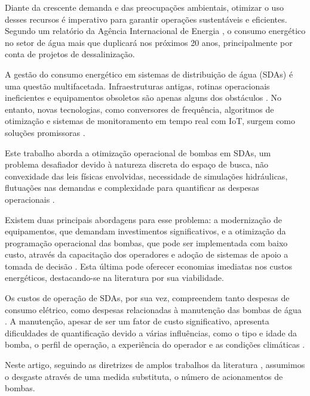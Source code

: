 \documentclass[12pt,a4paper,oneside,linenumbers=off,latinmodern=off,timesnews=off,english,spanish]{rctart-class/rctart}
\begin{document}
Diante da crescente demanda e das preocupações ambientais, otimizar o uso desses recursos é imperativo para garantir operações sustentáveis e eficientes. Segundo um relatório da Agência Internacional de Energia \cite{ieaWEO2016Special}, o consumo energético no setor de água mais que duplicará nos próximos 20 anos, principalmente por conta de projetos de dessalinização.

A gestão do consumo energético em sistemas de distribuição de água (SDAs) é uma questão multifacetada. Infraestruturas antigas, rotinas operacionais ineficientes e equipamentos obsoletos são apenas alguns dos obstáculos \cite{M2012, moura2010relaccao}. No entanto, novas tecnologias, como conversores de frequência, algoritmos de otimização e sistemas de monitoramento em tempo real com IoT, surgem como soluções promissoras \cite{Mackle1995, moura2010relaccao, ufopREPOSITORIOINSTITUCIONAL}.

Este trabalho aborda a otimização operacional de bombas em SDAs, um problema desafiador devido à natureza discreta do espaço de busca, não convexidade das leis físicas envolvidas, necessidade de simulações hidráulicas, flutuações nas demandas e complexidade para quantificar as despesas operacionais \cite{Makaremi2017}.

Existem duas principais abordagens para esse problema: a modernização de equipamentos, que demandam investimentos significativos, e a otimização da programação operacional das bombas, que pode ser implementada com baixo custo, através da capacitação dos operadores e adoção de sistemas de apoio a tomada de decisão \cite{Moreira2013}. Esta última pode oferecer economias imediatas nos custos energéticos, destacando-se na literatura por sua viabilidade.

Os custos de operação de SDAs, por sua vez, compreendem tanto despesas de consumo elétrico, como despesas relacionadas à manutenção das bombas de água \cite{vanZyl2004}. A manutenção, apesar de ser um fator de custo significativo, apresenta dificuldades de quantificação devido a várias influências, como o tipo e idade da bomba, o perfil de operação, a experiência do operador e as condições climáticas \cite{Makaremi2017}.

Neste artigo, seguindo as diretrizes de amplos trabalhos da literatura \cite{lopez2008ant, lansey1994optimal, boulos2001optimal, vanZyl2004, savic1997multiobjective, lopez2005multi, kelner2003optimal, bene2013comparison}, assumimos o desgaste através de uma medida substituta, o número de acionamentos de bombas.
\end{document}
